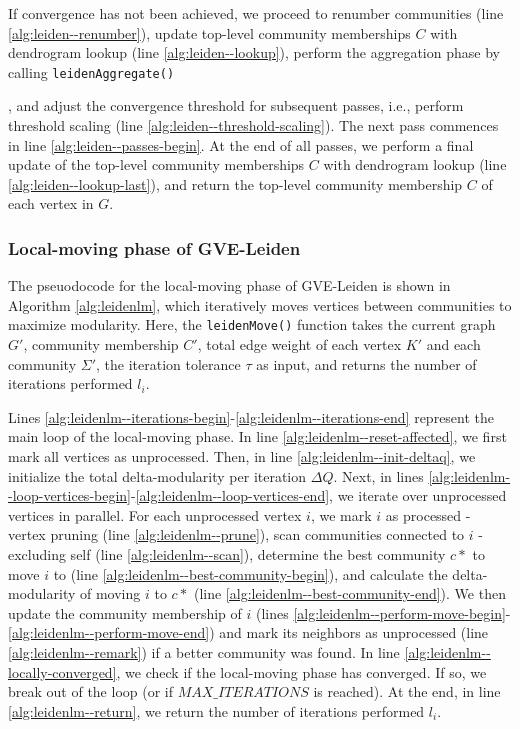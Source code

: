 If convergence has not been achieved, we proceed to renumber communities (line \ref{alg:leiden--renumber}), update top-level community memberships $C$ with dendrogram lookup (line \ref{alg:leiden--lookup}), perform the aggregation phase by calling \texttt{leidenAggregate()}, and adjust the convergence threshold for subsequent passes, i.e., perform threshold scaling (line \ref{alg:leiden--threshold-scaling}). The next pass commences in line \ref{alg:leiden--passes-begin}. At the end of all passes, we perform a final update of the top-level community memberships $C$ with dendrogram lookup (line \ref{alg:leiden--lookup-last}), and return the top-level community membership $C$ of each vertex in $G$.







\subsubsection{Local-moving phase of GVE-Leiden}

The pseuodocode for the local-moving phase of GVE-Leiden is shown in Algorithm \ref{alg:leidenlm}, which iteratively moves vertices between communities to maximize modularity. Here, the \texttt{leidenMove()} function takes the current graph $G'$, community membership $C'$, total edge weight of each vertex $K'$ and each community $\Sigma'$, the iteration tolerance $\tau$ as input, and returns the number of iterations performed $l_i$.

Lines \ref{alg:leidenlm--iterations-begin}-\ref{alg:leidenlm--iterations-end} represent the main loop of the local-moving phase. In line \ref{alg:leidenlm--reset-affected}, we first mark all vertices as unprocessed. Then, in line \ref{alg:leidenlm--init-deltaq}, we initialize the total delta-modularity per iteration $\Delta Q$. Next, in lines \ref{alg:leidenlm--loop-vertices-begin}-\ref{alg:leidenlm--loop-vertices-end}, we iterate over unprocessed vertices in parallel. For each unprocessed vertex $i$, we mark $i$ as processed - vertex pruning (line \ref{alg:leidenlm--prune}), scan communities connected to $i$ - excluding self (line \ref{alg:leidenlm--scan}), determine the best community $c*$ to move $i$ to (line \ref{alg:leidenlm--best-community-begin}), and calculate the delta-modularity of moving $i$ to $c*$ (line \ref{alg:leidenlm--best-community-end}). We then update the community membership of $i$ (lines \ref{alg:leidenlm--perform-move-begin}-\ref{alg:leidenlm--perform-move-end}) and mark its neighbors as unprocessed (line \ref{alg:leidenlm--remark}) if a better community was found. In line \ref{alg:leidenlm--locally-converged}, we check if the local-moving phase has converged. If so, we break out of the loop (or if $MAX\_ITERATIONS$ is reached). At the end, in line \ref{alg:leidenlm--return}, we return the number of iterations performed $l_i$.


